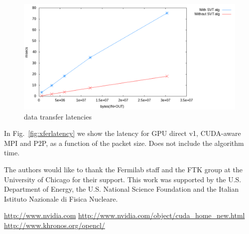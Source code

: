 \documentclass[letterpaper]{jpconf}
\begin{document}
\begin{figure}[tbp]
  \centering
  \includegraphics[width=0.7\linewidth]{figures/cudaware.pdf}
  \caption{data transfer latencies}
  \label{fig:transferOnly}
\end{figure}

In Fig.~\ref{fig:xferlatency} we show the latency for GPU direct v1,
CUDA-aware MPI and P2P, as a function of the packet size. Does not
include the algorithm time.


\ack
The authors would like to thank the Fermilab staff and the FTK group at the 
University of Chicago for their support. This work was supported by the
U.S. Department of Energy, the U.S. National Science Foundation and the Italian
Istituto Nazionale di Fisica Nucleare. 






\begin{thebibliography}{99}
 \url{http://www.nvidia.com}
\url{http://www.nvidia.com/object/cuda_home_new.html}
\url{http://www.khronos.org/opencl/}

\end{thebibliography}
 
\end{document}
